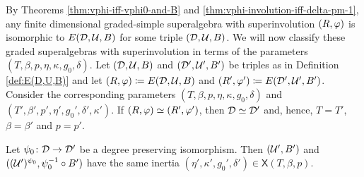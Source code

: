 By Theorems \ref{thm:vphi-iff-vphi0-and-B} and \ref{thm:vphi-involution-iff-delta-pm-1}, any finite dimensional graded-simple superalgebra with superinvolution $(R, \varphi)$ is isomorphic to $E(\mathcal{D}, \mathcal U, B)$ for some triple $(\mathcal{D}, \mathcal U, B)$. 
We will now classify these graded superalgebras with superinvolution in terms of the parameters $(T, \beta, p, \eta, \kappa, g_0, \delta)$.  
Let $(\mathcal{D}, \mathcal U, B)$ and $(\mathcal{D}', \mathcal U', B')$ be triples as in Definition \ref{def:E(D,U,B)} and let $(R, \varphi) \coloneqq E(\mathcal{D}, \mathcal U, B)$ and $(R', \varphi') \coloneqq E(\mathcal{D}', \mathcal U', B')$.
Consider the corresponding parameters $(T, \beta, p, \eta, \kappa, g_0, \delta)$ and $(T', \beta', p', \eta', g_0', \delta', \kappa')$. 
If $(R, \varphi) \simeq (R', \varphi')$, then $\mathcal{D} \simeq \mathcal{D}'$ and, hence, $T = T'$, $\beta = \beta'$ and $p = p'$. 

\begin{lemma}\label{lemma:twist-same-inertia}
    Let $\psi_0\colon \mathcal{D} \to \mathcal{D}'$ be a degree preserving isomorphism. 
    Then $(\mathcal U',B')$ and $((\mathcal U')^{\psi_0}, \psi_0^{-1} \circ B')$ have the same inertia $(\eta', \kappa', g_0', \delta') \in \mathsf{X}(T, \beta, p)$.
\end{lemma}

